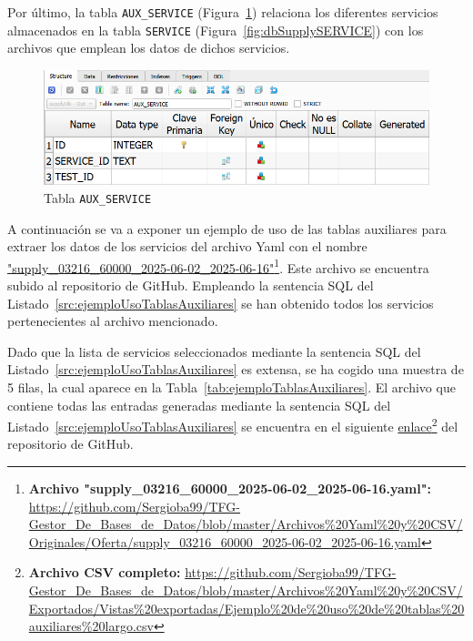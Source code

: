 Por último, la tabla \texttt{AUX\_SERVICE} (Figura~\ref{fig:dbSupplyAUX_SERVICE}) relaciona los diferentes servicios almacenados en la tabla \texttt{SERVICE} (Figura~\ref{fig:dbSupplySERVICE}) con los archivos que emplean los datos de dichos servicios.

\begin{figure}[H]
\centering
\includegraphics[width=.9\textwidth]{fig/Tablas base de datos/Oferta/AUX_SERVICE.png}
\caption{Tabla \texttt{AUX\_SERVICE}}
\label{fig:dbSupplyAUX_SERVICE}
\end{figure}

A continuación se va a exponer un ejemplo de uso de las tablas auxiliares para extraer los datos de los servicios del archivo \acrshort{Yaml} con el nombre \href{https://github.com/Sergioba99/TFG-Gestor_De_Bases_de_Datos/blob/master/Archivos%20Yaml%20y%20CSV/Originales/Oferta/supply_03216_60000_2025-06-02_2025-06-16.yaml}{"supply\_03216\_60000\_2025-06-02\_2025-06-16"}\footnote{\textbf{Archivo "supply\_03216\_60000\_2025-06-02\_2025-06-16.yaml":} \url{https://github.com/Sergioba99/TFG-Gestor_De_Bases_de_Datos/blob/master/Archivos\%20Yaml\%20y\%20CSV/Originales/Oferta/supply_03216_60000_2025-06-02_2025-06-16.yaml}}. Este archivo se encuentra subido al repositorio de GitHub. Empleando la sentencia \acrshort{SQL} del Listado~\ref{src:ejemploUsoTablasAuxiliares} se han obtenido todos los servicios pertenecientes al archivo mencionado.



Dado que la lista de servicios seleccionados mediante la sentencia \acrshort{SQL} del Listado~\ref{src:ejemploUsoTablasAuxiliares} es extensa, se ha cogido una muestra de 5 filas, la cual aparece en la Tabla~\ref{tab:ejemploTablasAuxiliares}. El archivo que contiene todas las entradas generadas mediante la sentencia \acrshort{SQL} del Listado~\ref{src:ejemploUsoTablasAuxiliares} se encuentra en el siguiente \href{https://github.com/Sergioba99/TFG-Gestor_De_Bases_de_Datos/blob/master/Archivos%20Yaml%20y%20CSV/Exportados/Vistas%20exportadas/Ejemplo%20de%20uso%20de%20tablas%20auxiliares%20largo.csv}{enlace}\footnote{\textbf{Archivo CSV completo:} \url{https://github.com/Sergioba99/TFG-Gestor_De_Bases_de_Datos/blob/master/Archivos\%20Yaml\%20y\%20CSV/Exportados/Vistas\%20exportadas/Ejemplo\%20de\%20uso\%20de\%20tablas\%20auxiliares\%20largo.csv}} del repositorio de GitHub.


